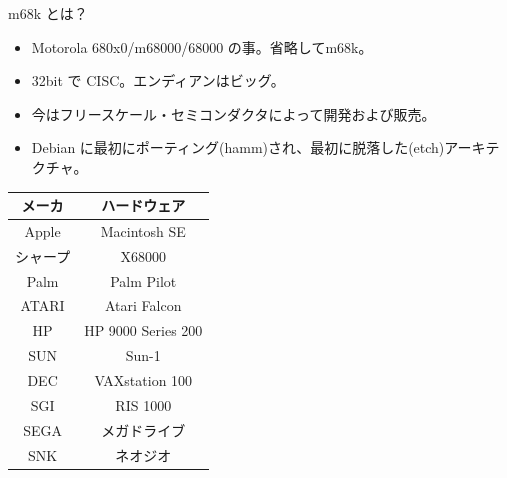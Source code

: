 \begin{frame}{m68k とは？}
\begin{minipage}{0.5\hsize}

\begin{itemize}
\item Motorola 680x0/m68000/68000 の事。省略してm68k。
\item 32bit で CISC。エンディアンはビッグ。
\item 今はフリースケール・セミコンダクタによって開発および販売。
\item Debian に最初にポーティング(hamm)され、最初に脱落した(etch)アーキテクチャ。
\end{itemize}
\end{minipage}
\begin{minipage}{0.4\hsize}
  \begin{tabular}{|c|c|}
 \hline
 メーカ & ハードウェア \\
 \hline
   Apple & Macintosh SE \\
   シャープ & X68000 \\
   Palm  & Palm Pilot \\ 
   ATARI & Atari Falcon \\
   HP & HP 9000 Series 200 \\
   SUN & Sun-1 \\
   DEC & VAXstation 100 \\
   SGI & RIS 1000 \\
   SEGA & メガドライブ \\
   SNK & ネオジオ \\
 \hline
 \end{tabular}
\end{minipage}
\end{frame}

